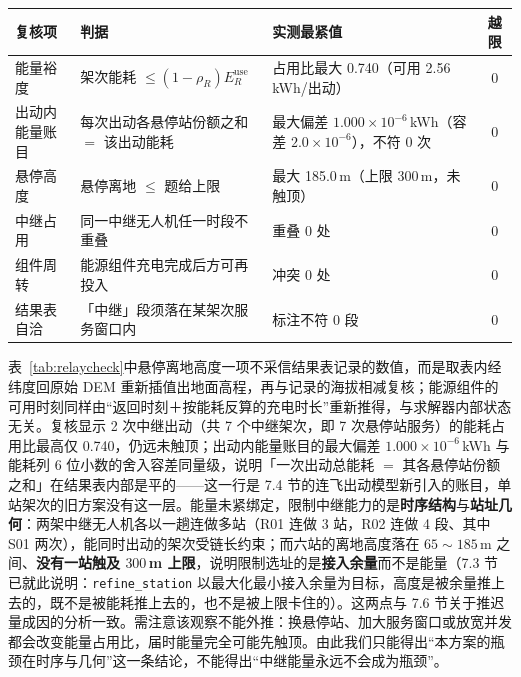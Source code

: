 \begin{center}
\begin{minipage}{\textwidth}
	\label{tab:relaycheck}
	\centering
	\begin{tabularx}{0.98\textwidth}{lXXc}
		\toprule
		复核项 & 判据 & 实测最紧值 & 越限 \\
		\midrule
		能量裕度 & 架次能耗 $\le(1-\rho_R)E_R^{\mathrm{use}}$ & 占用比最大 0.740（可用 2.56\,kWh/出动） & 0 \\
		出动内能量账目 & 每次出动各悬停站份额之和 $=$ 该出动能耗 & 最大偏差 $1.000\times10^{-6}$\,kWh（容差 $2.0\times10^{-6}$），不符 0 次 & 0 \\
		悬停高度 & 悬停离地 $\le$ 题给上限 & 最大 185.0\,m（上限 300\,m，未触顶） & 0 \\
		中继占用 & 同一中继无人机任一时段不重叠 & 重叠 0 处 & 0 \\
		组件周转 & 能源组件充电完成后方可再投入 & 冲突 0 处 & 0 \\
		结果表自洽 & 「中继」段须落在某架次服务窗口内 & 标注不符 0 段 & 0 \\
		\bottomrule
	\end{tabularx}
\end{minipage}
\end{center}

表~\ref{tab:relaycheck}中悬停离地高度一项不采信结果表记录的数值，而是取表内经纬度回原始 DEM 重新插值出地面高程，再与记录的海拔相减复核；能源组件的可用时刻同样由“返回时刻＋按能耗反算的充电时长”重新推得，与求解器内部状态无关。复核显示 2 次中继出动（共 7 个中继架次，即 7 次悬停站服务）的能耗占用比最高仅 0.740，仍远未触顶；出动内能量账目的最大偏差 $1.000\times10^{-6}$\,kWh 与能耗列 6 位小数的舍入容差同量级，说明「一次出动总能耗 $=$ 其各悬停站份额之和」在结果表内部是平的——这一行是 7.4 节的连飞出动模型新引入的账目，单站架次的旧方案没有这一层。能量未紧绑定，限制中继能力的是\textbf{时序结构}与\textbf{站址几何}：两架中继无人机各以一趟连做多站（R01 连做 3 站，R02 连做 4 段、其中 S01 两次），能同时出动的架次受链长约束；而六站的离地高度落在 $65\sim185$\,m 之间、\textbf{没有一站触及 $300$\,m 上限}，说明限制选址的是\textbf{接入余量}而不是能量（7.3 节已就此说明：\texttt{refine\_station} 以最大化最小接入余量为目标，高度是被余量推上去的，既不是被能耗推上去的，也不是被上限卡住的）。这两点与 7.6 节关于推迟量成因的分析一致。需注意该观察不能外推：换悬停站、加大服务窗口或放宽并发都会改变能量占用比，届时能量完全可能先触顶。由此我们只能得出“本方案的瓶颈在时序与几何”这一条结论，不能得出“中继能量永远不会成为瓶颈”。

